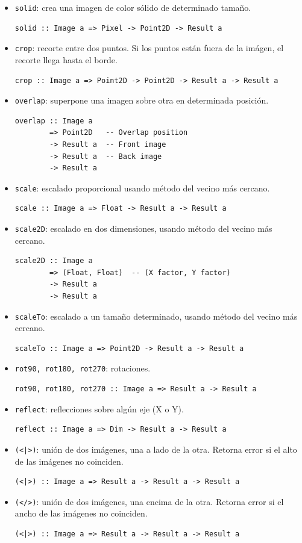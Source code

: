 \documentclass[a4paper, 11pt]{article} %
\begin{document}
	\begin{itemize} 
		\item \texttt{solid}: crea una imagen de color sólido de determinado tamaño.
\begin{lstlisting}
solid :: Image a => Pixel -> Point2D -> Result a
\end{lstlisting}
		\item \texttt{crop}: recorte entre dos puntos. Si los puntos están fuera de la imágen, el recorte llega hasta el borde.
\begin{lstlisting}
crop :: Image a => Point2D -> Point2D -> Result a -> Result a
\end{lstlisting}
		\item \texttt{overlap}: superpone una imagen sobre otra en determinada posición.
\begin{lstlisting}
overlap :: Image a 
        => Point2D   -- Overlap position
        -> Result a  -- Front image
        -> Result a  -- Back image
        -> Result a
\end{lstlisting}
		\item \texttt{scale}: escalado proporcional usando método del vecino más cercano.
\begin{lstlisting}
scale :: Image a => Float -> Result a -> Result a
\end{lstlisting}
		\item \texttt{scale2D}: escalado en dos dimensiones, usando método del vecino más cercano.
\begin{lstlisting}
scale2D :: Image a 
        => (Float, Float)  -- (X factor, Y factor)
        -> Result a 
        -> Result a
\end{lstlisting}
		\item \texttt{scaleTo}: escalado a un tamaño determinado, usando método del vecino más cercano.
\begin{lstlisting}
scaleTo :: Image a => Point2D -> Result a -> Result a
\end{lstlisting}
		\item \texttt{rot90, rot180, rot270}: rotaciones.
\begin{lstlisting}
rot90, rot180, rot270 :: Image a => Result a -> Result a
\end{lstlisting}

		\item \texttt{reflect}: reflecciones sobre algún eje (X o Y).
\begin{lstlisting}
reflect :: Image a => Dim -> Result a -> Result a
\end{lstlisting}
		\item \texttt{(<|>)}: unión de dos imágenes, una a lado de la otra. Retorna error si el alto de las imágenes no coinciden.
\begin{lstlisting}
(<|>) :: Image a => Result a -> Result a -> Result a
\end{lstlisting}
		\item \texttt{(</>)}: unión de dos imágenes, una encima de la otra. Retorna error si el ancho de las imágenes no coinciden.
\begin{lstlisting}
(<|>) :: Image a => Result a -> Result a -> Result a
\end{lstlisting}


\end{itemize}
\end{document}
